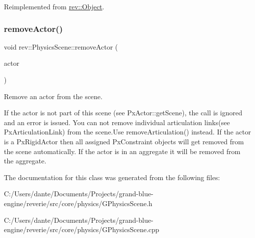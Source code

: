 Reimplemented from \mbox{\hyperlink{classrev_1_1_object_aaeb638d3e10f361c56c211a318a27f3d}{rev\+::\+Object}}.

\mbox{\label{classrev_1_1_physics_scene_a899ac2eb1fa688ad99042406ec105688}} 
\subsubsection{\texorpdfstring{removeActor()}{removeActor()}}
{\footnotesize\ttfamily void rev\+::\+Physics\+Scene\+::remove\+Actor (\begin{DoxyParamCaption}\item[{\mbox{\hyperlink{classrev_1_1_physics_actor}{Physics\+Actor}} $\ast$}]{actor }\end{DoxyParamCaption})}



Remove an actor from the scene. 

If the actor is not part of this scene (see Px\+Actor\+::get\+Scene), the call is ignored and an error is issued. You can not remove individual articulation links(see Px\+Articulation\+Link) from the scene.\+Use remove\+Articulation() instead. If the actor is a Px\+Rigid\+Actor then all assigned Px\+Constraint objects will get removed from the scene automatically. If the actor is in an aggregate it will be removed from the aggregate. 

The documentation for this class was generated from the following files\+:\begin{DoxyCompactItemize}
\item 
C\+:/\+Users/dante/\+Documents/\+Projects/grand-\/blue-\/engine/reverie/src/core/physics/G\+Physics\+Scene.\+h\item 
C\+:/\+Users/dante/\+Documents/\+Projects/grand-\/blue-\/engine/reverie/src/core/physics/G\+Physics\+Scene.\+cpp\end{DoxyCompactItemize}
